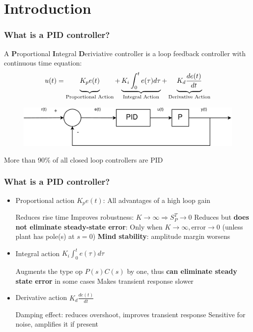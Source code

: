 


\section{Introduction}

\begin{frame}
	\frametitle{What is a PID controller?}
	\begin{definition}
		A \textbf{P}roportional \textbf{I}ntegral \textbf{D}eriviative controller is a loop feedback controller with continuous time equation:
		\begin{equation*}
			u(t) = 	\underbrace{\vphantom{\int^t_0e(\tau)d\tau}K_p e(t)}_\text{Proportional Action} 
					+ \underbrace{K_i\int^t_0e(\tau)d\tau}_\text{Integral Action} 
					+ \underbrace{\vphantom{\int^t_0e(\tau)d\tau} K_d \frac{de(t)}{dt}}_\text{Derivative Action}
		\end{equation*}
		\begin{figure}
			\centering
			\includegraphics[width=0.8\linewidth]{img/PID}
		\end{figure}
	\end{definition}
	More than 90\% of all closed loop controllers are PID
\end{frame}

\begin{frame}
	\frametitle{What is a PID controller?}
	\begin{itemize}
		\item Proportional action $K_p e(t)$: All advantages of a high loop gain
			\begin{itemize}
				\pro Reduces rise time
				\pro Improves robustness: $K \rightarrow \infty \Rightarrow S^T_P \rightarrow 0$
				\con Reduces but \textbf{does not eliminate steady-state error}: Only when $K \rightarrow \infty , \text{error} \rightarrow 0$
				 (unless plant has pole(s) at $s=0$)
				\con \textbf{Mind stability}: amplitude margin worsens
			\end{itemize}
		\pause
		\item Integral action $K_i\int_0^t e(\tau)d\tau$
			\begin{itemize}
				\pro Augments the type op $P(s)C(s)$ by one, thus \textbf{can eliminate steady state error} in some cases
				\con Makes transient response slower 
			\end{itemize}
		\pause
		\item Derivative action $K_d \frac{de(t)}{dt}$
		\begin{itemize}
			\pro Damping effect: reduces overshoot, improves transient response
			\con Sensitive for noise, amplifies it if present
		\end{itemize}
	\end{itemize}
\end{frame}

